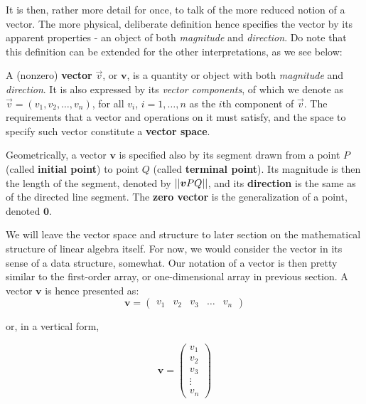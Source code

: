 It is then, rather more detail for once, to talk of the more reduced notion of a vector. The more physical, deliberate definition hence specifies the vector by its apparent properties - an object of both \textit{magnitude} and \textit{direction}. Do note that this definition can be extended for the other interpretations, as we see below: 
\begin{definition}[Vector]
    A (nonzero) \textbf{vector} $\vec{v}$, or $\mathbf{v}$, is a quantity or object with both \textit{magnitude} and \textit{direction}. It is also expressed by its \textit{vector components}, of which we denote as $\vec{v}=(v_1, v_2,\dots,v_n)$, for all $v_i$, $i=1,\dots,n$ as the $i$th component of $\vec{v}$. The requirements that a vector and operations on it must satisfy, and the space to specify such vector constitute a \textbf{vector space}. 

    Geometrically, a vector $\mathbf{v}$ is specified also by its segment drawn from a point $P$ (called \textbf{initial point}) to point $Q$ (called \textbf{terminal point}). Its magnitude is then the length of the segment, denoted by $\lvert\lvert {\bm{v}}{PQ}\rvert \rvert$, and its \textbf{direction} is the same as of the directed line segment. The \textbf{zero vector} is the generalization of a point, denoted $\mathbf{0}$.
\end{definition}

We will leave the vector space and structure to later section on the mathematical structure of linear algebra itself. For now, we would consider the vector in its sense of a data structure, somewhat. Our notation of a vector is then pretty similar to the first-order array, or one-dimensional array in previous section. A vector $\mathbf{v}$ is hence presented as: 
\begin{equation}
    \mathbf{v} = \begin{pmatrix}
        v_{1} & v_{2} & v_{3} & \dots & v_{n}
    \end{pmatrix}
\end{equation}

or, in a vertical form, 

\begin{equation}
    \mathbf{v} = \begin{pmatrix}
        v_{1} \\
        v_{2} \\ 
        v_{3} \\
        \vdots \\
        v_{n} 
    \end{pmatrix}
\end{equation}

